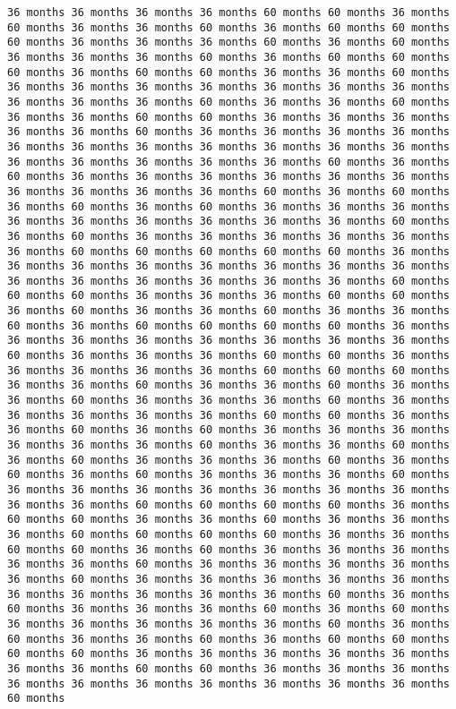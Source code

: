 \documentclass[11pt]{article}
\begin{document}
\begin{Verbatim}[commandchars=\\\{\}, frame=single, framerule=2mm, rulecolor=\color{outerrorbackground}]
36 months 36 months 36 months 36 months 60 months 60 months 36 months 60 months 36 months 36 months 60 months 36 months 60 months 60 months 60 months 36 months 36 months 36 months 60 months 36 months 60 months 36 months 36 months 36 months 60 months 36 months 60 months 60 months 60 months 36 months 60 months 60 months 36 months 36 months 60 months 36 months 36 months 36 months 36 months 36 months 36 months 36 months 36 months 36 months 36 months 60 months 36 months 36 months 60 months 36 months 36 months 60 months 60 months 36 months 36 months 36 months 36 months 36 months 60 months 36 months 36 months 36 months 36 months 36 months 36 months 36 months 36 months 36 months 36 months 36 months 36 months 36 months 36 months 36 months 36 months 60 months 36 months 60 months 36 months 36 months 36 months 36 months 36 months 36 months 36 months 36 months 36 months 36 months 60 months 36 months 60 months 36 months 60 months 36 months 60 months 36 months 36 months 36 months 36 months 36 months 36 months 36 months 36 months 36 months 60 months 36 months 60 months 36 months 36 months 36 months 36 months 36 months 36 months 60 months 60 months 60 months 60 months 60 months 36 months 36 months 36 months 36 months 36 months 36 months 36 months 36 months 36 months 36 months 36 months 36 months 36 months 36 months 60 months 60 months 60 months 36 months 36 months 36 months 60 months 60 months 36 months 60 months 36 months 36 months 60 months 36 months 36 months 60 months 36 months 60 months 60 months 60 months 60 months 36 months 36 months 36 months 36 months 36 months 36 months 36 months 36 months 60 months 36 months 36 months 36 months 60 months 60 months 36 months 36 months 36 months 36 months 36 months 60 months 60 months 60 months 36 months 36 months 60 months 36 months 36 months 60 months 36 months 36 months 60 months 36 months 36 months 36 months 60 months 36 months 36 months 36 months 36 months 36 months 60 months 60 months 36 months 36 months 60 months 36 months 60 months 36 months 36 months 36 months 36 months 36 months 36 months 60 months 36 months 36 months 60 months 36 months 60 months 36 months 36 months 36 months 60 months 36 months 60 months 36 months 60 months 36 months 36 months 36 months 60 months 36 months 36 months 36 months 36 months 36 months 36 months 36 months 36 months 36 months 60 months 60 months 60 months 60 months 36 months 60 months 60 months 36 months 36 months 60 months 36 months 36 months 36 months 60 months 60 months 60 months 60 months 36 months 36 months 60 months 60 months 36 months 60 months 36 months 36 months 36 months 36 months 36 months 60 months 36 months 36 months 36 months 36 months 36 months 60 months 36 months 36 months 36 months 36 months 36 months 36 months 36 months 36 months 36 months 36 months 60 months 36 months 60 months 36 months 36 months 36 months 60 months 36 months 60 months 36 months 36 months 36 months 36 months 36 months 60 months 36 months 60 months 36 months 36 months 60 months 36 months 60 months 60 months 60 months 60 months 36 months 36 months 36 months 36 months 36 months 36 months 36 months 60 months 60 months 36 months 36 months 36 months 36 months 36 months 36 months 36 months 36 months 36 months 36 months 60 months 
\end{Verbatim}
\end{document}
